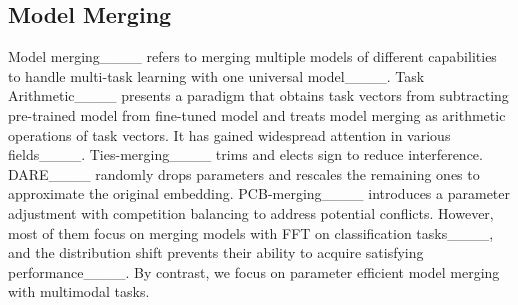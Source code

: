 \subsection{Model Merging}
Model merging____ refers to merging multiple models of different capabilities to handle multi-task learning with one universal model____. Task Arithmetic____ presents a paradigm that obtains task vectors from subtracting pre-trained model from fine-tuned model and treats model merging as arithmetic operations of task vectors. It has gained widespread attention in various fields____.
Ties-merging____ trims and elects sign to reduce interference. DARE____ randomly drops parameters and rescales the remaining ones to approximate the original embedding. PCB-merging____ introduces a parameter adjustment with competition balancing to address potential conflicts. However, most of them focus on merging models with FFT on classification tasks____, and the distribution shift prevents their ability to acquire satisfying performance____. By contrast, we focus on parameter efficient model merging with multimodal tasks.